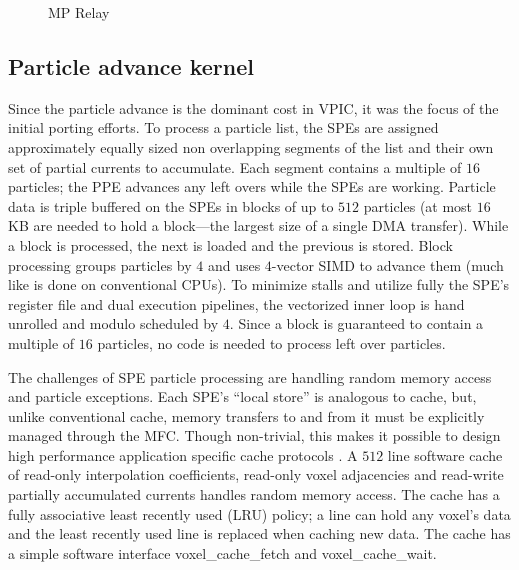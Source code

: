\documentclass[10pt]{article}
\begin{document}
\begin{figure}
    \begin{center}
    \caption{MP Relay}
    \label{fig:relay}
    \end{center}
\end{figure}

\subsection{Particle advance kernel}

Since the particle advance is the dominant cost in VPIC, it was the
focus of the initial porting efforts.  To process a particle list, the
SPEs are assigned approximately equally sized non overlapping segments
of the list and their own set of partial currents to accumulate.  Each
segment contains a multiple of $16$ particles; the PPE advances any
left overs while the SPEs are working.  Particle data is triple
buffered on the SPEs in blocks of up to $512$ particles (at most $16$
KB are needed to hold a block---the largest size of a single DMA
transfer).  While a block is processed, the next is loaded and the
previous is stored.
Block processing groups particles by $4$ and uses $4$-vector SIMD to
advance them (much like is done on conventional CPUs).  To minimize
stalls and utilize fully the SPE's register file and dual execution
pipelines, the vectorized inner loop is hand unrolled and modulo
scheduled by $4$.  Since a block is guaranteed to contain a multiple
of $16$ particles, no code is needed to process left over particles.

The challenges of SPE particle processing are handling random memory
access and particle exceptions.  Each SPE's ``local store'' is
analogous to cache, but, unlike conventional cache, memory transfers
to and from it must be explicitly managed through the MFC.  Though
non-trivial, this makes it possible to design high performance
application specific cache protocols \cite{Kahle_et_al_2005}.  A $512$
line software cache of read-only interpolation coefficients, read-only
voxel adjacencies and read-write partially accumulated currents
handles random memory access.  The cache has a fully associative least
recently used (LRU) policy; a line can hold any voxel's data and the
least recently used line is replaced when caching new data.  The cache
has a simple software interface voxel\_cache\_fetch and
voxel\_cache\_wait.
\end{document}
